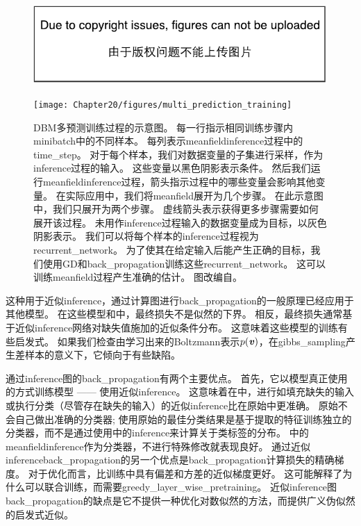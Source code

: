 \begin{figure}[!htb]
\ifOpenSource
\centerline{\includegraphics{figure.pdf}}
\else
\centerline{\texttt{[image: Chapter20/figures/multi\_prediction\_training]}}
\fi
\caption{\gls{DBM}多预测训练过程的示意图。
每一行指示相同训练步骤内\gls{minibatch}中的不同样本。
每列表示\gls{meanfield}\gls{inference}过程中的\gls{time_step}。
对于每个样本，我们对数据变量的子集进行采样，作为\gls{inference}过程的输入。
这些变量以黑色阴影表示条件。
然后我们运行\gls{meanfield}\gls{inference}过程，箭头指示过程中的哪些变量会影响其他变量。
在实际应用中，我们将\gls{meanfield}展开为几个步骤。
在此示意图中，我们只展开为两个步骤。
虚线箭头表示获得更多步骤需要如何展开该过程。
未用作\gls{inference}过程输入的数据变量成为目标，以灰色阴影表示。
我们可以将每个样本的\gls{inference}过程视为\gls{recurrent_network}。
为了使其在给定输入后能产生正确的目标，我们使用\gls{GD}和\gls{back_propagation}训练这些\gls{recurrent_network}。
这可以训练\gls{meanfield}过程产生准确的估计。
图改编自\citet{Goodfellow-et-al-NIPS2013}。
}
\label{fig:chap20_multi_prediction_training}
\end{figure}

这种用于近似\gls{inference}，通过计算图进行\gls{back_propagation}的一般原理已经应用于其他模型\citep{Stoyanov2011,brakel13a}。
在这些模型和中，最终损失不是似然的下界。
相反，最终损失通常基于近似\gls{inference}网络对缺失值施加的近似条件分布。
这意味着这些模型的训练有些启发式。
如果我们检查由学习出来的\gls{Boltzmann}表示$p(\boldsymbol{\mathit{v}})$，在\gls{gibbs_sampling}产生差样本的意义下，它倾向于有些缺陷。

通过\gls{inference}图的\gls{back_propagation}有两个主要优点。
首先，它以模型真正使用的方式训练模型 —— 使用近似\gls{inference}。
这意味着在中，进行如填充缺失的输入或执行分类（尽管存在缺失的输入）的近似\gls{inference}比在原始中更准确。
原始不会自己做出准确的分类器; 使用原始的最佳分类结果是基于提取的特征训练独立的分类器，而不是通过使用中的\gls{inference}来计算关于类标签的分布。
中的\gls{meanfield}\gls{inference}作为分类器，不进行特殊修改就表现良好。
通过近似\gls{inference}\gls{back_propagation}的另一个优点是\gls{back_propagation}计算损失的精确梯度。
对于优化而言，比训练中具有偏差和方差的近似梯度更好。
这可能解释了为什么可以联合训练，而需要\gls{greedy_layer_wise_pretraining}。
近似\gls{inference}图\gls{back_propagation}的缺点是它不提供一种优化对数似然的方法，而提供广义伪似然的启发式近似。

